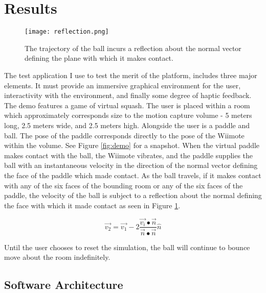 \section{Results}
\label{sec:results}

\begin{figure}[b!]
\centering
\texttt{[image: reflection.png]}
\caption{The trajectory of the ball incurs a reflection about the normal
vector defining the plane with which it makes contact.}
\label{fig:reflection}
\end{figure}

The test application I use to test the merit of the platform, includes three
major elements. It must provide an immersive graphical environment for the
user, interactivity with the environment, and finally some degree of haptic
feedback. The demo features a game of virtual squash. The user is placed within
a room which approximately corresponds size to the motion capture volume - 5
meters long, 2.5 meters wide, and 2.5 meters high. Alongside the user is a
paddle and ball. The pose of the paddle corresponds directly to the pose of the
Wiimote within the volume. See Figure \ref{fig:demo} for a snapshot.  When the
virtual paddle makes contact with the ball, the Wiimote vibrates, and the
paddle supplies the ball with an instantaneous velocity in the direction of the
normal vector defining the face of the paddle which made contact.  As the ball
travels, if it makes contact with any of the six faces of the bounding room or
any of the six faces of the paddle, the velocity of the ball is subject to a
reflection about the normal defining the face with which it made contact as
seen in Figure \ref{fig:reflection}. 

\[
\vec{v_{2}} = \vec{v_{1}} - 2 \frac{\vec{v_{i}} \bullet \vec{n}}{\vec{n} \bullet \vec{n}} \hat{n}
\]

Until the user chooses to reset the simulation, the ball will continue to 
bounce move about the room indefinitely.

\subsection{Software Architecture}

